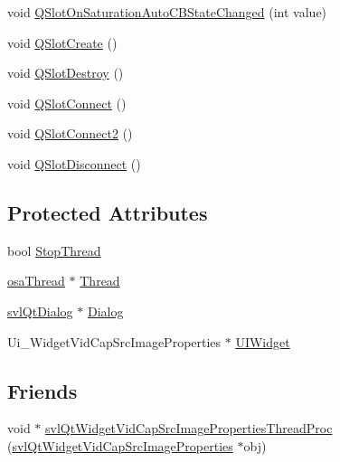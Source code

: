 \begin{DoxyCompactItemize}
\item 
void \hyperlink{classsvl_qt_widget_vid_cap_src_image_properties_a98d23a09a0f3accd01225ed6f6a89bab}{Q\+Slot\+On\+Saturation\+Auto\+C\+B\+State\+Changed} (int value)
\item 
void \hyperlink{classsvl_qt_widget_vid_cap_src_image_properties_a93807219dc4171e0dab366c3c4cac869}{Q\+Slot\+Create} ()
\item 
void \hyperlink{classsvl_qt_widget_vid_cap_src_image_properties_a97bf6b9eee12b33594fc951c602a6fdc}{Q\+Slot\+Destroy} ()
\item 
void \hyperlink{classsvl_qt_widget_vid_cap_src_image_properties_add7f0531c4e01579a59a2be2e10b5811}{Q\+Slot\+Connect} ()
\item 
void \hyperlink{classsvl_qt_widget_vid_cap_src_image_properties_a478f8c31aad5eac231c8652dffbffa07}{Q\+Slot\+Connect2} ()
\item 
void \hyperlink{classsvl_qt_widget_vid_cap_src_image_properties_aceb067bf447e29eafd7df69a0889f523}{Q\+Slot\+Disconnect} ()
\end{DoxyCompactItemize}
\subsection*{Protected Attributes}
\begin{DoxyCompactItemize}
\item 
bool \hyperlink{classsvl_qt_widget_vid_cap_src_image_properties_aded19bf213eaf8d3c8d6621d98ee85d8}{Stop\+Thread}
\item 
\hyperlink{classosa_thread}{osa\+Thread} $\ast$ \hyperlink{classsvl_qt_widget_vid_cap_src_image_properties_ab9dc088e704551eca6d2ba3a9888f968}{Thread}
\item 
\hyperlink{classsvl_qt_dialog}{svl\+Qt\+Dialog} $\ast$ \hyperlink{classsvl_qt_widget_vid_cap_src_image_properties_ac4580e7f0283c64369cb50428966b12d}{Dialog}
\item 
Ui\+\_\+\+Widget\+Vid\+Cap\+Src\+Image\+Properties $\ast$ \hyperlink{classsvl_qt_widget_vid_cap_src_image_properties_ac38817abd20ff403980a47cf9c237b48}{U\+I\+Widget}
\end{DoxyCompactItemize}
\subsection*{Friends}
\begin{DoxyCompactItemize}
\item 
void $\ast$ \hyperlink{classsvl_qt_widget_vid_cap_src_image_properties_a4ae0501bac6e06e5ffa41e416d45c773}{svl\+Qt\+Widget\+Vid\+Cap\+Src\+Image\+Properties\+Thread\+Proc} (\hyperlink{classsvl_qt_widget_vid_cap_src_image_properties}{svl\+Qt\+Widget\+Vid\+Cap\+Src\+Image\+Properties} $\ast$obj)
\end{DoxyCompactItemize}
